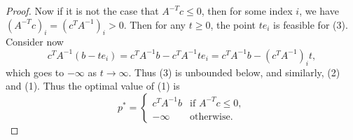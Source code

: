 \documentclass[12pt]{article}
\begin{document}
\begin{proof}
    Now if it is not the case that $A^{-T}c\leq0$, then for some index $i$, we have $(A^{-T}c)_i = (c^TA^{-1})_i >0$. Then for any $t\geq0$, the point $te_i$ is feasible for (3). Consider now
    \[c^TA^{-1}(b-te_i) = c^TA^{-1}b-c^TA^{-1}te_i = c^TA^{-1}b-(c^TA^{-1})_it,\]
    which goes to $-\infty$ as $t\to\infty$. Thus (3) is unbounded below, and similarly, (2) and (1). Thus the optimal value of (1) is
    \[p^*=
    \begin{cases}
        c^TA^{-1}b &\text{if } A^{-T}c \leq 0, \\
        -\infty &\text{otherwise.}
    \end{cases}
\]
    
\end{proof}
\end{document}
